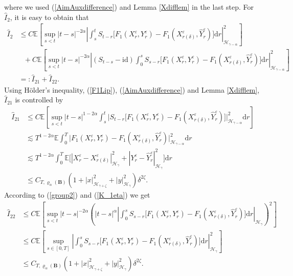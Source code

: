 \documentclass[10pt,a4paper]{article}
\numberwithin{equation}{section}
\begin{document}
where we used (\ref{AimAuxdifference}) and Lemma \ref{Xdifflem} in the last step.
For $\hat{I}_2$, it is easy to obtain that
\begin{align*}
\hat{I}_2 & \leq C   \mathbb E \left [ \sup_{s<t} |t-s|^{-2\alpha} \left| \int_s^t S_{t-r}\big[ F_1(X_r^\varepsilon,Y_r^\varepsilon)-F_1(X_{r(\delta)}^\varepsilon,\hat{Y}_r^\varepsilon) \big]\mathrm{d} r \right|_{\mathcal H_{\gamma-\alpha} }^2 \right ] \nonumber\\
&~~~+C \mathbb E \left [ \sup_{s<t} |t-s|^{-2\alpha} \left| (S_{t-s}-\mathrm{\mathrm{id} })\int_0^s S_{s-r}\big[F_1(X_r^\varepsilon,Y_r^\varepsilon)-F_1(X_{r(\delta)}^\varepsilon,\hat{Y}_r^\varepsilon) \big] \mathrm{d} r \right|_{\mathcal H_{\gamma-\alpha} }^2 \right ] \nonumber\\
&=: \hat{I}_{21}+\hat{I}_{22}.	
\end{align*}
Using H\"{o}lder's inequality, (\ref{F1Lip}), (\ref{AimAuxdifference}) and Lemma \ref{Xdifflem}, $\hat{I}_{21}$ is controlled by
\begin{align}\label{hatI21}
\hat{I}_{21} & \leq C \mathbb E \left [ \sup_{s<t} |t-s|^{1-2\alpha}  \int_s^t \big| S_{t-r} \big[ F_1(X_r^\varepsilon,Y_r^\varepsilon)-F_1(X_{r(\delta)}^\varepsilon,\hat{Y}_r^\varepsilon) \big] \big|_{\mathcal H_{\gamma-\alpha} }^2  \mathrm{d} r \right ] \nonumber\\
&\lesssim T^{1-2\alpha} \mathbb E \int_0^T \big| F_1(X_r^\varepsilon,Y_r^\varepsilon)-F_1(X_{r(\delta)}^\varepsilon,\hat{Y}_r^\varepsilon)  \big|_{\mathcal H_{\gamma-\alpha} }^2  \mathrm{d} r \nonumber\\
&\lesssim  T^{1-2\alpha}  \int_0^T  \mathbb E \big[| X_r^\varepsilon
-X_{r(\delta)}^\varepsilon |_{\mathcal H_\gamma }^2+|Y_r^\varepsilon-\hat{Y}_r^\varepsilon|_{\mathcal H_\gamma }^2 \big] \mathrm{d} r \nonumber\\
& \leq  C_{T,\varrho_{\alpha}(\mathbf{B})} (1+|x|_{\mathcal{H}_{\gamma+\zeta}}^2+|y|_{\mathcal{H}_\gamma}^2)\delta^{2\zeta}.
\end{align}
According to (\ref{group2}) and (\ref{K_1eta}) we get
\begin{align}\label{hatI22}
\hat{I}_{22} & \leq C \mathbb E \left [ \sup_{s<t} |t-s|^{-2\alpha} \left( |t-s|^\alpha \left| \int_0^s S_{s-r}\big[F_1(X_r^\varepsilon,Y_r^\varepsilon)-F_1(X_{r(\delta)}^\varepsilon,\hat{Y}_r^\varepsilon) \big] \mathrm{d} r \right|_{\mathcal H_\gamma }  \right)^2\right ] \nonumber\\	
& \leq C \mathbb E \left [ \sup_{s \in [0,T]}  \left| \int_0^s S_{s-r}\big[F_1(X_r^\varepsilon,Y_r^\varepsilon)-F_1(X_{r(\delta)}^\varepsilon,\hat{Y}_r^\varepsilon) \big] \mathrm{d} r \right|_{\mathcal H_{\gamma} }^2\right ] \nonumber\\
& \leq C_{T,\varrho_{\alpha}(\mathbf{B})} (1+|x|_{\mathcal{H}_{\gamma+\zeta}}^2+|y|_{\mathcal{H}_\gamma}^2)\delta^{2\zeta}.
\end{align}
\end{document}
